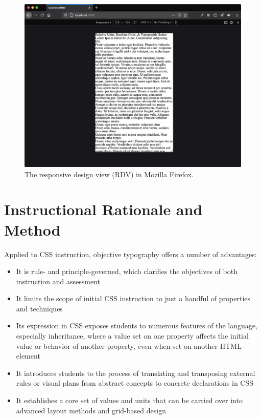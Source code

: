 \documentclass[sigplan,screen]{acmart}
\begin{document}
\begin{figure}
  \includegraphics[width=\linewidth]{rdv}
  \caption{The responsive design view (RDV) in Mozilla Firefox.}
  \label{fig:rdv}
\end{figure}


\section{Instructional Rationale and Method}

Applied to CSS instruction, objective typography offers a number of advantages:

\begin{itemize}
  \item It is rule- and principle-governed, which clarifies the objectives of both instruction and assessment
  \item It limits the scope of initial CSS instruction to just a handful of properties and techniques
  \item Its expression in CSS exposes students to numerous features of the language, especially inheritance, where a value set on one property affects the initial value or behavior of another property, even when set on another HTML element
  \item It introduces students to the process of translating and transposing external rules or visual plans from abstract concepts to concrete declarations in CSS
  \item It establishes a core set of values and units that can be carried over into advanced layout methods and grid-based design
\end{itemize}
\end{document}
